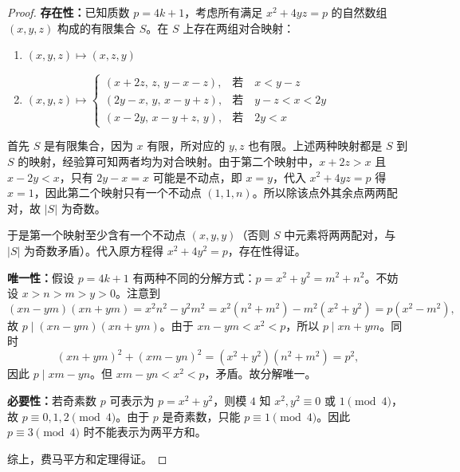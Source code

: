 \begin{proof}

\textbf{存在性：}已知质数 $p = 4k + 1$，考虑所有满足 $x^2 + 4yz = p$ 的自然数组 $(x, y, z)$ 构成的有限集合 $S$。在 $S$ 上存在两组对合映射：

\begin{enumerate}
\item $(x, y, z) \mapsto (x, z, y)$
\item $(x, y, z) \mapsto 
\begin{cases}(x + 2z,\, z,\, y - x - z), & \text{若} \quad x < y - z \\[4pt]
(2y - x,\, y,\, x - y + z), & \text{若} \quad y - z < x < 2y \\[4pt]
(x - 2y,\, x - y + z,\, y), & \text{若} \quad 2y < x\end{cases}$
\end{enumerate}

首先 $S$ 是有限集合，因为 $x$ 有限，所对应的 $y, z$ 也有限。上述两种映射都是 $S$ 到 $S$ 的映射，经验算可知两者均为对合映射。由于第二个映射中，$x + 2z > x$ 且 $x - 2y < x$，只有 $2y - x = x$ 可能是不动点，即 $x = y$，代入 $x^2 + 4yz = p$ 得 $x = 1$，因此第二个映射只有一个不动点 $(1, 1, n)$。所以除该点外其余点两两配对，故 $|S|$ 为奇数。

于是第一个映射至少含有一个不动点 $(x, y, y)$（否则 $S$ 中元素将两两配对，与 $|S|$ 为奇数矛盾）。代入原方程得 $x^2 + 4y^2 = p$，存在性得证。

\textbf{唯一性：}假设 $p = 4k + 1$ 有两种不同的分解方式：$p = x^2 + y^2 = m^2 + n^2$。不妨设 $x > n > m > y > 0$。注意到
\[
(xn - ym)(xn + ym) = x^2n^2 - y^2m^2 = x^2(n^2 + m^2) - m^2(x^2 + y^2) = p(x^2 - m^2),
\]
故 $p \mid (xn - ym)(xn + ym)$。由于 $xn - ym < x^2 < p$，所以 $p \mid xn + ym$。同时
\[
(xn + ym)^2 + (xm - yn)^2 = (x^2 + y^2)(n^2 + m^2) = p^2,
\]
因此 $p \mid xm - yn$。但 $xm - yn < x^2 < p$，矛盾。故分解唯一。

\textbf{必要性：}若奇素数 $p$ 可表示为 $p = x^2 + y^2$，则模 $4$ 知 $x^2, y^2 \equiv 0$ 或 $1 \pmod 4$，故 $p \equiv 0,1,2 \pmod 4$。由于 $p$ 是奇素数，只能 $p \equiv 1 \pmod 4$。因此 $p \equiv 3 \pmod 4$ 时不能表示为两平方和。

综上，费马平方和定理得证。

\end{proof}